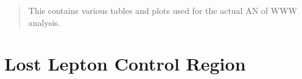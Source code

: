 \documentclass[12pt]{article}
\begin{document}
\maketitle

\begin{abstract}
This contains various tables and plots used for the actual AN of WWW analysis.
\end{abstract}

\section{Lost Lepton Control Region}
\end{document}
